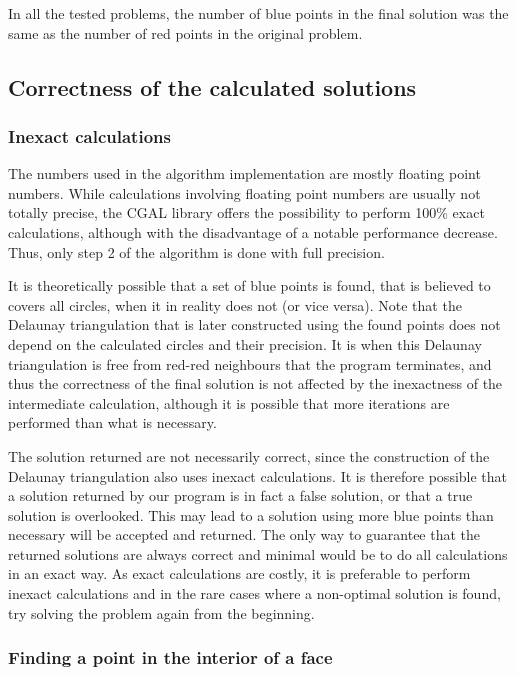 \documentclass[a4paper,12pt]{article}
\begin{document}
In all the tested problems, the number of blue points in the final solution was the same as the number of red points in the original problem.


\subsection{Correctness of the calculated solutions}
\subsubsection{Inexact calculations}

The numbers used in the algorithm implementation are mostly floating point numbers. While calculations involving floating point numbers are usually not totally precise, the CGAL library offers the possibility to perform 100\% exact calculations, although with the disadvantage of a notable performance decrease. Thus, only step 2 of the algorithm is done with full precision.

It is theoretically possible that a set of blue points is found, that is believed to covers all circles, when it in reality does not (or vice versa). Note that the Delaunay triangulation that is later constructed using the found points does not depend on the calculated circles and their precision. It is when this Delaunay triangulation is free from red-red neighbours that the program terminates, and thus the correctness of the final solution is not affected by the inexactness of the intermediate calculation, although it is possible that more iterations are performed than what is necessary.

The solution returned are not necessarily correct, since the construction of the Delaunay triangulation also uses inexact calculations. It is therefore possible that a solution returned by our program is in fact a false solution, or that a true solution is overlooked. This may lead to a solution using more blue points than necessary will be accepted and returned. The only way to guarantee that the returned solutions are always correct and minimal would be to do all calculations in an exact way. As exact calculations are costly, it is preferable to perform inexact calculations and in the rare cases where a non-optimal solution is found, try solving the problem again from the beginning.

\subsubsection{Finding a point in the interior of a face}
\end{document}
